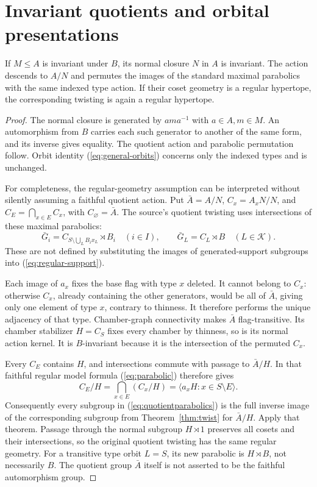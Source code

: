 \section{Invariant quotients and orbital presentations}
\begin{lemma}[Quotients]\label{lem:quotient}
If $M\leq A$ is invariant under $B$, its normal closure $N$ in $A$ is invariant. The action descends to $A/N$ and permutes the images of the standard maximal parabolics with the same indexed type action. If their coset geometry is a regular hypertope, the corresponding twisting is again a regular hypertope.
\end{lemma}
\begin{proof}
The normal closure is generated by $a m a^{-1}$ with $a\in A,m\in M$. An automorphism from $B$ carries each such generator to another of the same form, and its inverse gives equality. The quotient action and parabolic permutation follow. Orbit identity (\ref{eq:general-orbits}) concerns only the indexed types and is unchanged.

For completeness, the regular-geometry assumption can be interpreted without silently assuming a faithful quotient action. Put $\bar A=A/N$, $C_x=A_xN/N$, and $C_E=\bigcap_{x\in E}C_x$, with $C_\varnothing=\bar A$. The source's quotient twisting uses intersections of these maximal parabolics:
\begin{equation}\label{eq:quotientparabolics}
\bar G_i=C_{S\setminus\bigcup_L B_ix_L}\rtimes B_i\quad(i\in I),
\qquad \bar G_L=C_L\rtimes B\quad(L\in\mathcal K).
\end{equation}
These are not defined by substituting the images of generated-support subgroups into (\ref{eq:regular-support}).

Each image of $a_x$ fixes the base flag with type $x$ deleted. It cannot belong to $C_x$: otherwise $C_x$, already containing the other generators, would be all of $\bar A$, giving only one element of type $x$, contrary to thinness. It therefore performs the unique adjacency of that type. Chamber-graph connectivity makes $\bar A$ flag-transitive. Its chamber stabilizer $H=C_S$ fixes every chamber by thinness, so is its normal action kernel. It is $B$-invariant because it is the intersection of the permuted $C_x$.

Every $C_E$ contains $H$, and intersections commute with passage to $\bar A/H$. In that faithful regular model formula (\ref{eq:parabolic}) therefore gives
\[
C_E/H=\bigcap_{x\in E}(C_x/H)
=\langle a_xH:x\in S\setminus E\rangle.
\]
Consequently every subgroup in (\ref{eq:quotientparabolics}) is the full inverse image of the corresponding subgroup from Theorem~\ref{thm:twist} for $\bar A/H$. Apply that theorem. Passage through the normal subgroup $H\rtimes1$ preserves all cosets and their intersections, so the original quotient twisting has the same regular geometry. For a transitive type orbit $L=S$, its new parabolic is $H\rtimes B$, not necessarily $B$. The quotient group $\bar A$ itself is not asserted to be the faithful automorphism group.
\end{proof}

